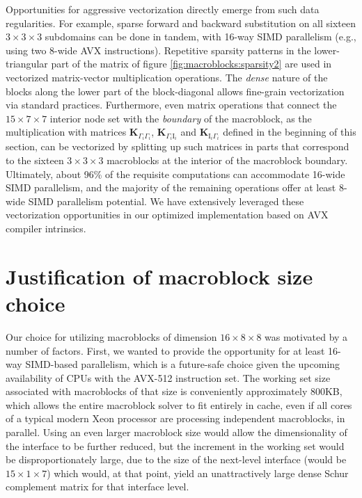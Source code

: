 Opportunities for aggressive vectorization directly emerge from such
data regularities. For example, sparse forward and backward
substitution on all sixteen $3\times 3\times 3$ subdomains can be done
in tandem, with 16-way SIMD parallelism (e.g., using two 8-wide AVX
instructions). Repetitive sparsity patterns in the lower-triangular
part of the matrix of figure \ref{fig:macroblocks:sparsity2} are used in
vectorized matrix-vector multiplication operations. The \emph{dense}
nature of the blocks along the lower part of the block-diagonal allows
fine-grain vectorization via standard practices.  Furthermore, even
matrix operations that connect the $15\times 7\times 7$ interior node
set with the \emph{boundary} of the macroblock, as the multiplication
with matrices $\mathbf{K}_{\Gamma_i\Gamma_i}$,
$\mathbf{K}_{\Gamma_i\mathrm{I}_i}$ and
$\mathbf{K}_{\mathrm{I}_i\Gamma_i}$ defined in the beginning of this
section, can be vectorized by splitting up such matrices in parts that
correspond to the sixteen $3\times 3\times 3$ macroblocks at the
interior of the macroblock boundary. Ultimately, about 96\% of the
requisite computations can accommodate 16-wide SIMD parallelism, and
the majority of the remaining operations offer at least 8-wide SIMD
parallelism potential. We have extensively leveraged these
vectorization opportunities in our optimized implementation based on
AVX compiler intrinsics.

\section{Justification of macroblock size choice}
\label{sec:macroblocks:analysis}

Our choice for utilizing macroblocks of dimension $16\times 8\times 8$
was motivated by a number of factors. First, we wanted to provide the
opportunity for at least 16-way SIMD-based parallelism, which is a
future-safe choice given the upcoming availability of CPUs with the
AVX-512 instruction set. The working set size associated with
macroblocks of that size is conveniently approximately 800KB, which
allows the entire macroblock solver to fit entirely in cache, even if
all cores of a typical modern Xeon processor are processing
independent macroblocks, in parallel. Using an even larger macroblock
size would allow the dimensionality of the interface to be further
reduced, but the increment in the working set would be
disproportionately large, due to the size of the next-level interface
(would be $15\times 1\times 7$) which would, at that point, yield an
unattractively large dense Schur complement matrix for that interface
level.


